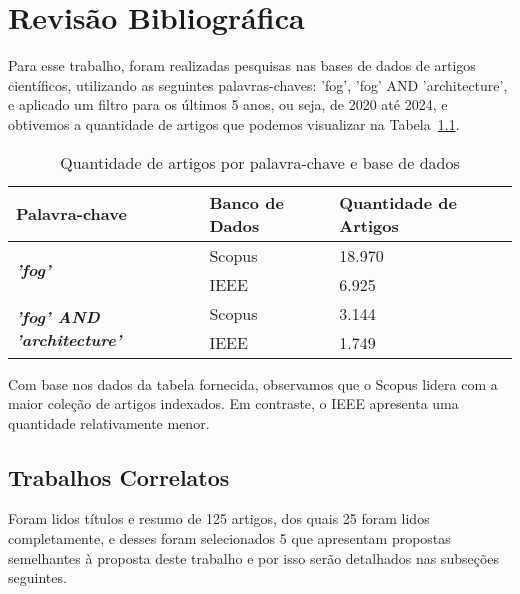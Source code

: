 \chapter{Revisão Bibliográfica}\label{cap:revisao_bibliografica}

Para esse trabalho, foram realizadas pesquisas nas bases de dados de artigos científicos, utilizando as seguintes palavras-chaves: 'fog', 'fog' AND 'architecture', e aplicado um filtro para os últimos 5 anos, ou seja, de 2020 até 2024, e obtivemos a quantidade de artigos que podemos visualizar na Tabela~\ref{tab:Tab_ArtigosFog}.

\begin{table}[htb]
	\ABNTEXfontereduzida
	\caption{\label{tab:Tab_ArtigosFog}Quantidade de artigos por palavra-chave e base de dados}
	\begin{tabular}{@{}p{6.5cm}p{3.5cm}p{4cm}@{}}
		\toprule
		\textbf{Palavra-chave} & \textbf{Banco de Dados} & \textbf{Quantidade de Artigos} \\ \midrule
		\multirow[c]{2}{*}{\textbf{\textit{'fog'}}} 
		    & Scopus & 18.970 \\
		    & IEEE   & 6.925  \\ \midrule
		\multirow[c]{2}{*}{\textbf{\textit{'fog' AND 'architecture'}}} 
		    & Scopus & 3.144 \\
		    & IEEE   & 1.749 \\ \midrule
	\end{tabular}
\end{table}

Com base nos dados da tabela fornecida, observamos que o Scopus lidera com a maior coleção de artigos indexados. Em contraste, o IEEE apresenta uma quantidade relativamente menor.

\section{Trabalhos Correlatos}\label{cap:trabalhos_relacionados}

Foram lidos títulos e resumo de 125 artigos, dos quais 25 foram lidos completamente, e desses foram selecionados 5 que apresentam propostas semelhantes à proposta deste trabalho e por isso serão detalhados nas subseções seguintes.

